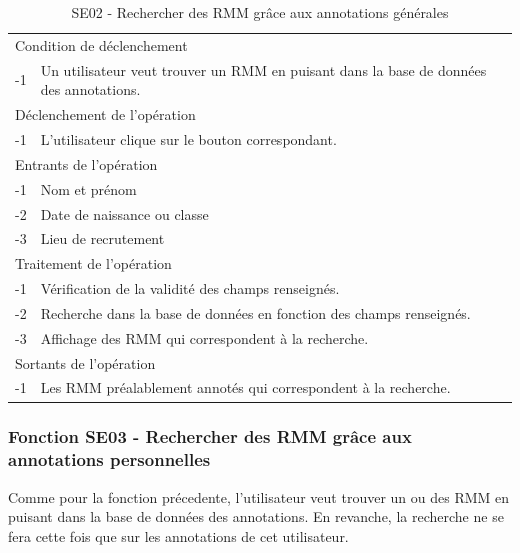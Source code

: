 \documentclass[a4paper]{article}
\begin{document}
\begin{table}[H]
  \centering
   \small
	\begin{tabular}{|c|p{12cm}|}
   		\hline
   			\rowcolor{lightgray}\multicolumn{2}{|c|}{\textbf{SE02 - Rechercher des RMM grâce aux annotations générales}} \\
   		\hline
   			\multicolumn{2}{|l|}{Condition de d\'eclenchement} \\
   		\hline
   			-1 & Un utilisateur veut trouver un RMM en puisant dans la base de données des annotations. \\
   		\hline
   			\multicolumn{2}{|l|}{D\'eclenchement de l'op\'eration} \\
   		\hline
   			-1 & L'utilisateur clique sur le bouton correspondant. \\
   		\hline
   			\multicolumn{2}{|l|}{Entrants de l'op\'eration} \\
   		\hline
   			-1 & Nom et prénom \\
        	-2 & Date de naissance ou classe \\ 
        	-3 & Lieu de recrutement \\
   		\hline
   			\multicolumn{2}{|l|}{Traitement de l'op\'eration} \\
  		\hline
  			-1 & Vérification de la validité des champs renseignés. \\
   			-2 & Recherche dans la base de données en fonction des champs renseignés. \\
        	-3 & Affichage des RMM qui correspondent à la recherche. \\
   		\hline
   			\multicolumn{2}{|l|}{Sortants de l'op\'eration} \\
   		\hline
   			-1 & Les RMM préalablement annotés qui correspondent à la recherche. \\
   		\hline
	\end{tabular}
  \caption{SE02 - Rechercher des RMM grâce aux annotations générales}
  \normalsize
  \label{tab:SE02}
\end{table}

\subsubsection{Fonction SE03 - Rechercher des RMM grâce aux annotations personnelles}

Comme pour la fonction précedente, l'utilisateur veut trouver un ou des RMM en puisant dans la base de données des annotations. En revanche, la recherche ne se fera cette fois que sur les annotations de cet utilisateur. 
\\
\end{document}
